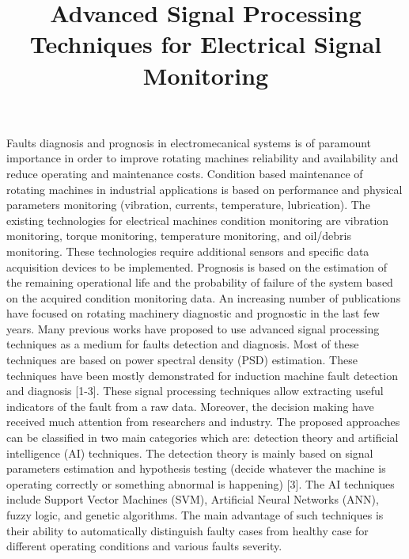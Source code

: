 \documentclass{article}
\begin{document}
\title{Advanced Signal Processing Techniques for Electrical Signal Monitoring}
   
 \maketitle  
 


Faults diagnosis and prognosis in electromecanical systems is of paramount importance in order to improve rotating machines reliability and availability and reduce operating and maintenance costs. Condition based maintenance of rotating machines in industrial applications is based on performance and physical parameters monitoring (vibration, currents, temperature, lubrication). The existing technologies for electrical machines condition monitoring are vibration monitoring, torque monitoring, temperature monitoring, and oil/debris monitoring. These technologies require additional sensors and specific data acquisition devices to be implemented. Prognosis is based on the estimation of the remaining operational life and the probability of failure of the system based on the acquired condition monitoring data. An increasing number of publications have focused on rotating machinery diagnostic and prognostic in the last few years. Many previous works have proposed to use advanced signal processing techniques as a medium for faults detection and diagnosis. Most of these techniques are based on power spectral density (PSD) estimation.  These techniques have been mostly demonstrated for induction machine fault detection and diagnosis [1-3]. These signal processing techniques allow extracting useful indicators of the fault from a raw data. Moreover, the decision making have received much attention from researchers and industry. The proposed approaches can be classified in two main categories which are: detection theory and artificial intelligence (AI) techniques. The detection theory is mainly based on signal parameters estimation and hypothesis testing (decide whatever the machine is operating correctly or something abnormal is happening) [3]. The AI techniques include Support Vector Machines (SVM), Artificial Neural Networks (ANN), fuzzy logic, and genetic algorithms. The main advantage of such techniques is their ability to automatically distinguish faulty cases from healthy case for different operating conditions and various faults severity. 
\end{document}
